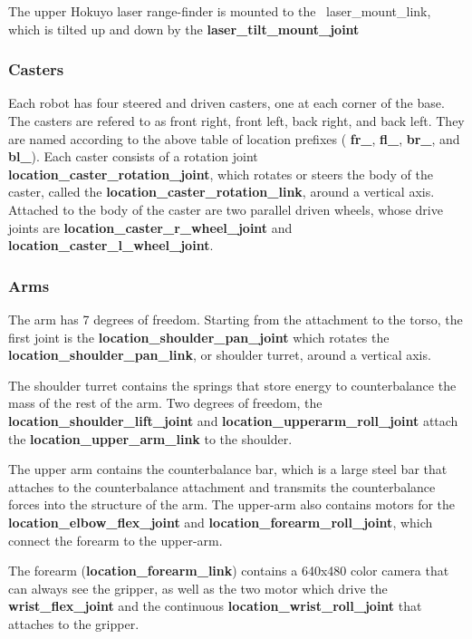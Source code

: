 The upper Hokuyo laser range-finder is mounted to the {\ laser\_mount\_link},
which is tilted up and down by the {\bf laser\_tilt\_mount\_joint}
\subsubsection{Casters}
Each robot has four steered and driven casters, one at each corner of the base.
The casters are refered to as front right, front left, back right, and back
left.  They are named according to the above table of location prefixes ({\bf
  fr\_}, {\bf fl\_}, {\bf br\_}, and {\bf bl\_}).  Each caster consists of a
rotation joint {\bf location\_caster\_rotation\_joint}, which rotates or steers
the body of the caster, called the {\bf location\_caster\_rotation\_link},
around a vertical axis.  Attached to the body of the caster are two parallel
driven wheels, whose drive joints are {\bf location\_caster\_r\_wheel\_joint}
and {\bf location\_caster\_l\_wheel\_joint}.

\subsubsection{Arms}
The arm has 7 degrees of freedom.  Starting from the attachment to the torso,
the first joint is the {\bf location\_shoulder\_pan\_joint} which rotates the
{\bf location\_shoulder\_pan\_link}, or shoulder turret, around a vertical axis.

The shoulder turret contains the springs that store energy to counterbalance the
mass of the rest of the arm.  Two degrees of freedom, the {\bf
  location\_shoulder\_lift\_joint} and {\bf location\_upperarm\_roll\_joint}
attach the {\bf location\_upper\_arm\_link} to the shoulder.

The upper arm contains the counterbalance bar, which is a large steel bar that
attaches to the counterbalance attachment and transmits the counterbalance
forces into the structure of the arm.  The upper-arm also contains motors for
the {\bf location\_elbow\_flex\_joint} and {\bf location\_forearm\_roll\_joint},
which connect the forearm to the upper-arm.

The forearm ({\bf location\_forearm\_link}) contains a 640x480 color camera that
can always see the gripper, as well as the two motor which drive the {\bf
  wrist\_flex\_joint} and the continuous {\bf location\_wrist\_roll\_joint} that
attaches to the gripper.

